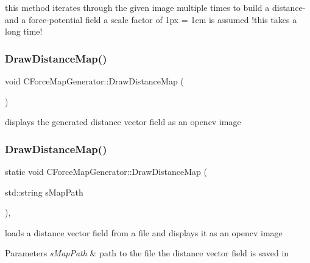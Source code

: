 this method iterates through the given image multiple times to build a distance-\/ and a force-\/potential field a scale factor of 1px = 1cm is assumed !this takes a long time! \mbox{\label{classCForceMapGenerator_a80a8ceee6174a3f0420d70bab79f0129}} 
\subsubsection{\texorpdfstring{Draw\+Distance\+Map()}{DrawDistanceMap()}\hspace{0.1cm}{\footnotesize\ttfamily [1/2]}}
{\footnotesize\ttfamily void C\+Force\+Map\+Generator\+::\+Draw\+Distance\+Map (\begin{DoxyParamCaption}{ }\end{DoxyParamCaption})\hspace{0.3cm}{\ttfamily [inline]}}

displays the generated distance vector field as an opencv image \mbox{\label{classCForceMapGenerator_a09b76abc4d57bd7f10ecd9b4895e3575}} 
\subsubsection{\texorpdfstring{Draw\+Distance\+Map()}{DrawDistanceMap()}\hspace{0.1cm}{\footnotesize\ttfamily [2/2]}}
{\footnotesize\ttfamily static void C\+Force\+Map\+Generator\+::\+Draw\+Distance\+Map (\begin{DoxyParamCaption}\item[{std\+::string}]{s\+Map\+Path }\end{DoxyParamCaption})\hspace{0.3cm}{\ttfamily [inline]}, {\ttfamily [static]}}

loads a distance vector field from a file and displays it as an opencv image 
\begin{DoxyParams}{Parameters}
{\em s\+Map\+Path} & path to the file the distance vector field is saved in \\
\hline
\end{DoxyParams}
\mbox{\label{classCForceMapGenerator_a9880307758a447f1e9eded5ccb7d339d}} 
